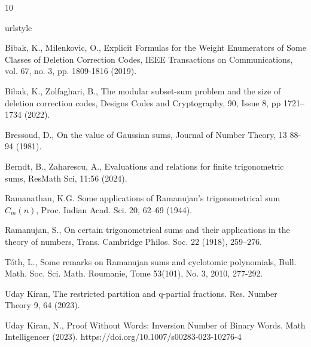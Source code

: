 \documentclass[12pt]{article}
\begin{document}
\begin{thebibliography}{10}
\providecommand{\url}[1]{{#1}}
\providecommand{\urlprefix}{URL }
\addtocounter{\@listctr}{0}
\makeatother
\expandafter\ifx\csname urlstyle\endcsname\relax
\providecommand{\doi}[1]{DOI~\discretionary{}{}{}#1}\else
\providecommand{\doi}{DOI~\discretionary{}{}{}\begingroup
	\urlstyle{rm}\Url}\fi




 Bibak, K., Milenkovic, O., Explicit Formulas for the Weight Enumerators of Some Classes of Deletion Correction Codes, IEEE Transactions on Communications, vol. 67, no. 3, pp. 1809-1816 (2019).

 Bibak, K., Zolfaghari, B., The modular subset-sum problem and the size of deletion correction codes, Designs Codes and Cryptography, 90, Issue 8, pp 1721–1734 (2022).

 Bressoud, D., On the value of Gaussian sums, Journal of Number Theory, 13 88-94 (1981).

 Berndt, B., Zaharescu, A., Evaluations and relations for finite trigonometric sums, ResMath Sci, 11:56 (2024).

 Ramanathan, K.G. Some applications of Ramanujan’s trigonometrical sum $C_{m}(n)$, Proc. Indian Acad. Sci. 20, 62–69 (1944). 

 Ramanujan, S., On certain trigonometrical sums and their applications in the theory of numbers, Trans. Cambridge Philos. Soc. 22 (1918), 259–276.

 T\'{o}th, L., Some remarks on Ramanujan sums and cyclotomic polynomials, Bull. Math. Soc. Sci. Math. Roumanie, Tome 53(101), No. 3, 2010, 277-292. 

 Uday Kiran, The restricted partition and q-partial fractions. Res. Number Theory 9, 64 (2023). 

 Uday Kiran, N., Proof Without Words: Inversion Number of Binary Words. Math Intelligencer (2023). https://doi.org/10.1007/s00283-023-10276-4



\end{thebibliography}
\end{document}
